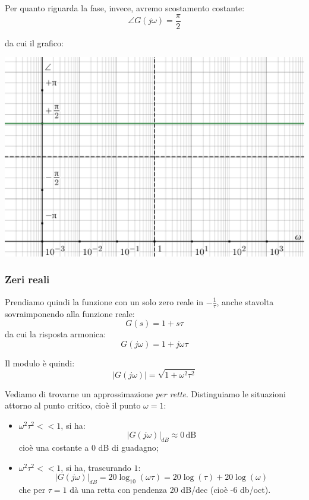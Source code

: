 \documentclass[a4paper,11pt]{article}
\begin{document}
\par\bigskip

Per quanto riguarda la fase, invece, avremo scostamento costante:
$$
\angle G(j \omega) =  \frac{\pi}{2}
$$

\par\bigskip

\noindent
\begin{minipage}{\textwidth}
da cui il grafico:
\begin{center}
	\includegraphics[scale=0.3]{../figures/differentiator_bode/phase.png}
\end{center}
\end{minipage}

\par\bigskip

\subsubsection{Zeri reali}
Prendiamo quindi la funzione con un solo zero reale in $-\frac{1}{\tau}$, anche stavolta sovraimponendo alla funzione reale:
$$
G(s) = 1 + s \tau
$$
da cui la risposta armonica:
$$
G(j \omega) = 1 + j \omega \tau
$$

Il modulo è quindi:
$$
|G(j \omega)| = \sqrt{1 + \omega^2 \tau^2}
$$

Vediamo di trovarne un approssimazione \textit{per rette}.
Distinguiamo le situazioni attorno al punto critico, cioè il punto $\omega = 1$:
\begin{itemize}
	\item $\omega^2 \tau^2 << 1$, si ha:
		$$
		|G(j\omega)|_{dB} \approx 0 \, \mathrm{dB}
		$$
		cioè una costante a 0 dB di guadagno;
	\item $\omega^2 \tau^2 << 1$, si ha, trascurando $1$:
		$$
		|G(j \omega)|_{dB} = 20 \log_{10} \left( \omega \tau \right) =
		20 \log \left( \tau \right) + 20 \log \left( \omega \right)
		$$
		che per $\tau = 1$ dà una retta con pendenza 20 dB/dec (cioè -6 db/oct).
\end{itemize}
\end{document}
